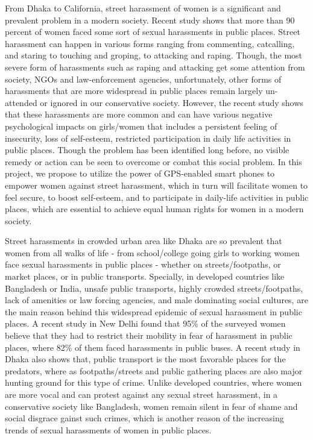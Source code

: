 \documentclass{sig-alternate}
\begin{document}
From Dhaka to California, street harassment of women is a significant and prevalent problem in a modern society. Recent study shows that more than 90 percent of women faced some sort of sexual harassments in public places. Street harassment can happen in various forms ranging from commenting, catcalling, and staring to touching and groping, to attacking and raping. Though, the most severe form of harassments such as raping and attacking get some attention from society, NGOs and law-enforcement agencies, unfortunately, other forms of harassments that are more widespread in public places remain largely un-attended or ignored in our conservative society. However, the recent study shows that these harassments are more common and can have various negative psychological impacts on girls/women that includes a persistent feeling of insecurity, loss of self-esteem, restricted participation in daily life activities in public places. Though the problem has been identified long before, no visible remedy or action can be seen to overcome or combat this social problem. In this project, we propose to utilize the power of GPS-enabled smart phones to empower women against street harassment, which in turn will facilitate women to feel secure, to boost self-esteem, and to participate in daily-life activities in public places, which are essential to achieve equal human rights for women in a modern society.

Street harassments in crowded urban area like Dhaka are so prevalent that women from all walks of life - from school/college going girls to working women face sexual harassments in public places - whether  on streets/footpaths, or market places, or in public transports. Specially, in developed countries like Bangladesh or India, unsafe public transports, highly crowded streets/footpaths, lack of amenities or law forcing agencies, and male dominating social cultures, are the main reason behind this widespread epidemic of sexual harassment in public places. A recent study in New Delhi found that 95\% of the surveyed women believe that they had to restrict their mobility in fear of harassment in public places, where 82\% of them faced harassments in public buses. A recent study in Dhaka also shows that, public transport is the most favorable places for the predators, where as footpaths/streets and public gathering places are also major hunting ground for this type of crime. Unlike developed countries, where women are more vocal and can protest against any sexual street harassment,  in a conservative society like Bangladesh, women remain silent in fear of shame and social disgrace gainst such crimes, which is another reason of the increasing trends of sexual harassments of women in public places.
\end{document}
